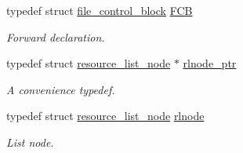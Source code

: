 \begin{DoxyCompactItemize}
\mbox{\label{group__rlists_ga60c6c294fa1d8ea73ed270404fe5c17d}} 
typedef struct \hyperlink{structfile__control__block}{file\+\_\+control\+\_\+block} \hyperlink{group__rlists_ga60c6c294fa1d8ea73ed270404fe5c17d}{F\+CB}
\begin{DoxyCompactList}\small\item\em Forward declaration. \end{DoxyCompactList}\item 
\mbox{\label{group__rlists_gaae2ea9be18d20f0c80a62a2f8e2eed4d}} 
typedef struct \hyperlink{structresource__list__node}{resource\+\_\+list\+\_\+node} $\ast$ \hyperlink{group__rlists_gaae2ea9be18d20f0c80a62a2f8e2eed4d}{rlnode\+\_\+ptr}
\begin{DoxyCompactList}\small\item\em A convenience typedef. \end{DoxyCompactList}\item 
\mbox{\label{group__rlists_ga8f6244877f7ce2322c90525217ea6e7a}} 
typedef struct \hyperlink{structresource__list__node}{resource\+\_\+list\+\_\+node} \hyperlink{group__rlists_ga8f6244877f7ce2322c90525217ea6e7a}{rlnode}
\begin{DoxyCompactList}\small\item\em List node. \end{DoxyCompactList}\end{DoxyCompactItemize}
